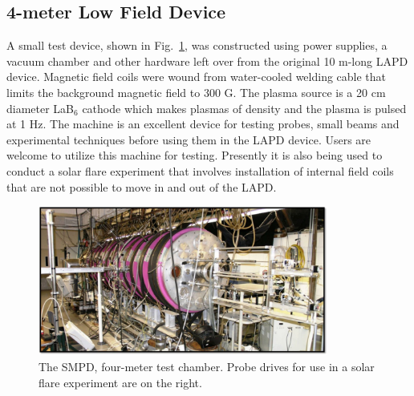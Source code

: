 \documentclass[11pt]{article}
\begin{document}
\subsection{4-meter Low Field Device}
A small test device, shown in Fig.\ \ref{fig:smpd}, was constructed using power supplies, a vacuum chamber and other hardware left over from the original 10 m-long LAPD device.  Magnetic field coils were wound from water-cooled welding cable that limits the background magnetic field to 300 G.  The plasma source is a 20 cm diameter LaB$_{6}$ cathode which makes plasmas of density   and the plasma is pulsed at 1 Hz.  The machine is an excellent device for testing probes, small beams and experimental techniques before using them in the LAPD device.  Users are welcome to utilize this machine for testing.  Presently it is also being used to conduct a solar flare experiment that involves installation of internal field coils that are not possible to move in and out of the LAPD.
\begin{figure}[htbp] %
   \centering
   \includegraphics[width=0.85\textwidth]{smpd.jpg} 
   \caption{The SMPD, four-meter test chamber.  Probe drives for use in a solar flare experiment are on the right.}
   \label{fig:smpd}
\end{figure}
\end{document}
